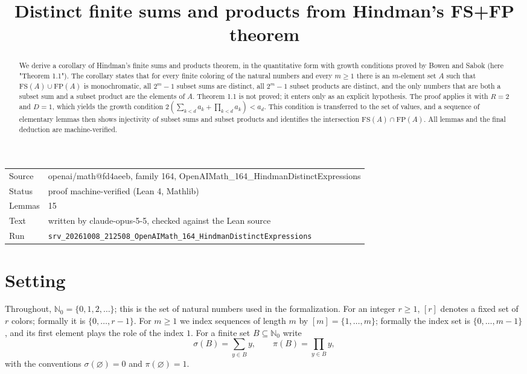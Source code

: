 \documentclass[11pt]{article}
\title{Distinct finite sums and products from Hindman's FS+FP theorem}
\date{}
\theoremstyle{definition}
\theoremstyle{remark}
\newcommand{\Nz}{\mathbb{N}_0}
\begin{document}
\maketitle
\begin{abstract}
We derive a corollary of Hindman's finite sums and products theorem, in the quantitative form with growth conditions proved by Bowen and Sabok (here "Theorem 1.1"). The corollary states that for every finite coloring of the natural numbers and every $m\ge 1$ there is an $m$-element set $A$ such that $\mathrm{FS}(A)\cup\mathrm{FP}(A)$ is monochromatic, all $2^m-1$ subset sums are distinct, all $2^m-1$ subset products are distinct, and the only numbers that are both a subset sum and a subset product are the elements of $A$. Theorem 1.1 is not proved; it enters only as an explicit hypothesis. The proof applies it with $R=2$ and $D=1$, which yields the growth condition $2(\sum_{k<d}a_k+\prod_{k<d}a_k)<a_d$. This condition is transferred to the set of values, and a sequence of elementary lemmas then shows injectivity of subset sums and subset products and identifies the intersection $\mathrm{FS}(A)\cap\mathrm{FP}(A)$. All lemmas and the final deduction are machine-verified.
\end{abstract}

\begin{center}\small
\begin{tabular}{@{}ll@{}}
\toprule
Source & openai/math@fd4aeeb, family 164, OpenAIMath\_164\_HindmanDistinctExpressions \\
Status & proof machine-verified (Lean 4, Mathlib) \\
Lemmas & 15 \\
Text & written by claude-opus-5-5, checked against the Lean source \\
Run & \texttt{srv\_20261008\_212508\_OpenAIMath\_164\_HindmanDistinctExpressions} \\
\bottomrule
\end{tabular}
\end{center}

\tableofcontents

\section{Setting}

Throughout, $\Nz=\{0,1,2,\ldots\}$; this is the set of natural numbers used in the formalization. For an integer $r\ge1$, $[r]$ denotes a fixed set of $r$ colors; formally it is $\{0,\ldots,r-1\}$. For $m\ge1$ we index sequences of length $m$ by $[m]=\{1,\ldots,m\}$; formally the index set is $\{0,\ldots,m-1\}$, and its first element plays the role of the index $1$. For a finite set $B\subseteq\Nz$ write
\[
\sigma(B)=\sum_{y\in B}y,\qquad \pi(B)=\prod_{y\in B}y,
\]
with the conventions $\sigma(\varnothing)=0$ and $\pi(\varnothing)=1$.
\end{document}
